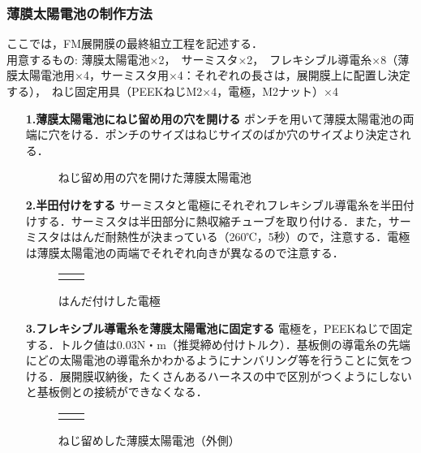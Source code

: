 \subsubsection*{薄膜太陽電池の制作方法}
ここでは，FM展開膜の最終組立工程を記述する．\\
用意するもの:
薄膜太陽電池×2，　サーミスタ×2，　フレキシブル導電糸×8（薄膜太陽電池用×4，サーミスタ用×4：それぞれの長さは，展開膜上に配置し決定する），　ねじ固定用具（PEEKねじM2×4，電極，M2ナット）×4
\begin{itemize}
	\item[\textbf{1.薄膜太陽電池にねじ留め用の穴を開ける}]
	ポンチを用いて薄膜太陽電池の両端に穴をける．ポンチのサイズはねじサイズのばか穴のサイズより決定される．
	\begin{figure}[H]
		\centering
		\caption{ねじ留め用の穴を開けた薄膜太陽電池}
		\label{fig3-9-3-3}
	\end{figure}
	\item[\textbf{2.半田付けをする}]
	サーミスタと電極にそれぞれフレキシブル導電糸を半田付けする．サーミスタは半田部分に熱収縮チューブを取り付ける．また，サーミスタははんだ耐熱性が決まっている（260℃，5秒）ので，注意する．電極は薄膜太陽電池の両端でそれぞれ向きが異なるので注意する．
	\begin{figure}[H]
		\begin{tabular}{cc}
			\begin{minipage}[t]{0.45\hsize}
				\centering
				\caption{はんだ付けしたサーミスタ}
				\label{fig3-9-3-4}
			\end{minipage} &
		
			\begin{minipage}[t]{0.45\hsize}
				\centering
				\caption{はんだ付けした電極}
				\label{fig3-9-3-5}
			\end{minipage}
		\end{tabular}	
	\end{figure}
	\item[\textbf{3.フレキシブル導電糸を薄膜太陽電池に固定する}]
	電極を，PEEKねじで固定する．トルク値は0.03N・m（推奨締め付けトルク）．基板側の導電糸の先端にどの太陽電池の導電糸かわかるようにナンバリング等を行うことに気をつける．展開膜収納後，たくさんあるハーネスの中で区別がつくようにしないと基板側との接続ができなくなる．
		\begin{figure}[H]
		\begin{tabular}{cc}
			\begin{minipage}[t]{0.45\hsize}
				\centering
				\caption{ねじ留めした薄膜太陽電池（外側）}
				\label{fig3-9-3-6}
			\end{minipage} &
			

\end{tabular}
\end{figure}
\end{itemize}
